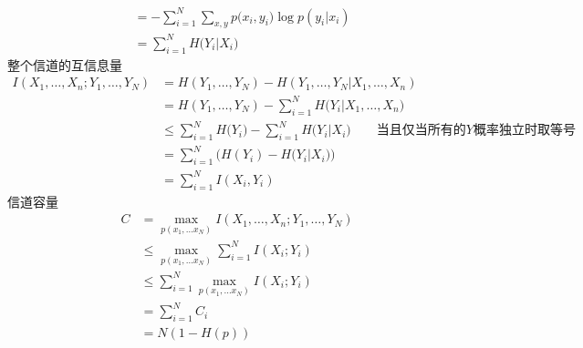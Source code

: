 \documentclass{exam}
\begin{document}
\begin{CJK*}{UTF8}{gbsn}
\begin{questions}
\begin{solution}
\begin{equation*}
\begin{split}
        	&  =  - \sum\limits_{i = 1}^N {\sum\limits_{x,y} {p(} {x_i},{y_i})\log p({y_i}|{x_i})}  \\
        	& = \sum\limits_{i = 1}^N {H({Y_i}|} {X_i})
        	\end{split}
        	\end{equation*}
        	整个信道的互信息量
        	\begin{equation*}
        	\begin{split}
        	I({X_1}, \ldots ,{X_n};{Y_1}, \ldots ,{Y_N}) &= H({Y_1}, \ldots ,{Y_N}) - H({Y_1}, \ldots ,{Y_N}|{X_1}, \ldots ,{X_n})\\
        	& = H({Y_1}, \ldots ,{Y_N}) - \sum\limits_{i = 1}^N {H({Y_i}|} {X_1}, \ldots ,{X_n})\\
        	&  \le \sum\limits_{i = 1}^N {H({Y_i}} ) - \sum\limits_{i = 1}^N {H({Y_i}|} {X_i})\qquad \text{当且仅当所有的$Y$概率独立时取等号}\\
        	& = \sum\limits_{i = 1}^N {(H({Y_i}) - H({Y_i}|} {X_i}))\\
        	& = \sum\limits_{i = 1}^N {I({X_i},{Y_i})} 
        	\end{split}
        	\end{equation*}
        	信道容量
        	\begin{equation*}
        	\begin{split}
        	C &= \mathop {\max }\limits_{p({x_1}, \ldots {x_N})} I({X_1}, \ldots ,{X_n};{Y_1}, \ldots ,{Y_N})\\
        	& \le \mathop {\max }\limits_{p({x_1}, \ldots {x_N})} \sum\limits_{i = 1}^N {I({X_i};{Y_i})} \\
        	& \le \sum\limits_{i = 1}^N {\mathop {\max }\limits_{p({x_1}, \ldots {x_N})} I({X_i};{Y_i})} \\
        	& = \sum\limits_{i = 1}^N {{C_i}}\\
        	& = N(1 - H(p))
        	\end{split}
        	\end{equation*}
        \end{solution}
    \end{questions}
    \newpage
\end{CJK*}
\end{document}
